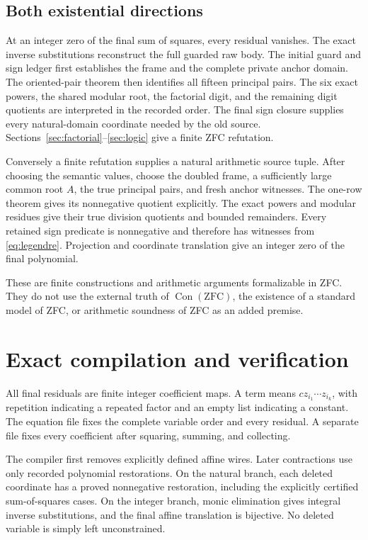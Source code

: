 \documentclass[11pt]{article}
\theoremstyle{remark}\newtheorem{remark}[theorem]{Remark}
\newcommand{\Con}{\operatorname{Con}}
\newcommand{\code}[1]{\texttt{\detokenize{#1}}}
\begin{document}
\subsection{Both existential directions}

At an integer zero of the final sum of squares, every residual vanishes. The exact inverse substitutions reconstruct the full guarded raw body. The initial guard and sign ledger first establishes the frame and the complete private anchor domain. The oriented-pair theorem then identifies all fifteen principal pairs. The six exact powers, the shared modular root, the factorial digit, and the remaining digit quotients are interpreted in the recorded order. The final sign closure supplies every natural-domain coordinate needed by the old source. Sections~\ref{sec:factorial}--\ref{sec:logic} give a finite ZFC refutation.

Conversely a finite refutation supplies a natural arithmetic source tuple. After choosing the semantic values, choose the doubled frame, a sufficiently large common root $A$, the true principal pairs, and fresh anchor witnesses. The one-row theorem gives its nonnegative quotient explicitly. The exact powers and modular residues give their true division quotients and bounded remainders. Every retained sign predicate is nonnegative and therefore has witnesses from \eqref{eq:legendre}. Projection and coordinate translation give an integer zero of the final polynomial.

These are finite constructions and arithmetic arguments formalizable in ZFC. They do not use the external truth of $\Con(\mathrm{ZFC})$, the existence of a standard model of ZFC, or arithmetic soundness of ZFC as an added premise.

\section{Exact compilation and verification}
\label{sec:verification}

All final residuals are finite integer coefficient maps. A term \code{[c,[i1,...,ik]]} means $c z_{i_1}\cdots z_{i_k}$, with repetition indicating a repeated factor and an empty list indicating a constant. The equation file fixes the complete variable order and every residual. A separate file fixes every coefficient after squaring, summing, and collecting.

The compiler first removes explicitly defined affine wires. Later contractions use only recorded polynomial restorations. On the natural branch, each deleted coordinate has a proved nonnegative restoration, including the explicitly certified sum-of-squares cases. On the integer branch, monic elimination gives integral inverse substitutions, and the final affine translation is bijective. No deleted variable is simply left unconstrained.
\end{document}

